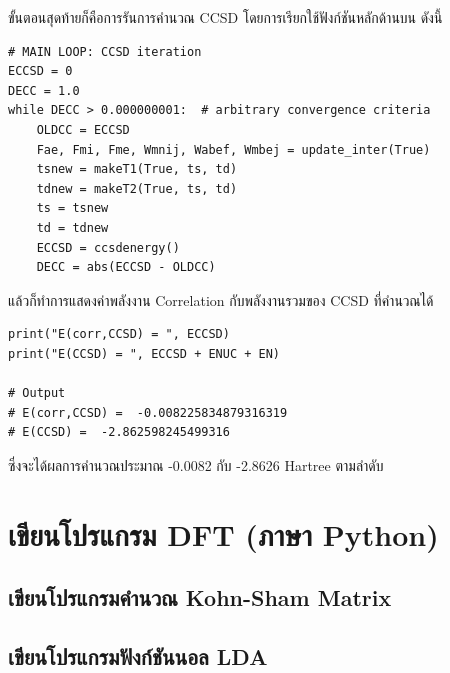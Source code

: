 \vspace{5pt}

\noindent ขั้นตอนสุดท้ายก็คือการรันการคำนวณ CCSD โดยการเรียกใช้ฟังก์ชันหลักด้านบน ดังนี้

\vspace{5pt}

\begin{lstlisting}[style=MyPython]
# MAIN LOOP: CCSD iteration
ECCSD = 0
DECC = 1.0
while DECC > 0.000000001:  # arbitrary convergence criteria
    OLDCC = ECCSD
    Fae, Fmi, Fme, Wmnij, Wabef, Wmbej = update_inter(True)
    tsnew = makeT1(True, ts, td)
    tdnew = makeT2(True, ts, td)
    ts = tsnew
    td = tdnew
    ECCSD = ccsdenergy()
    DECC = abs(ECCSD - OLDCC)
\end{lstlisting}

\vspace{5pt}

\noindent แล้วก็ทำการแสดงค่าพลังงาน Correlation กับพลังงานรวมของ CCSD ที่คำนวณได้

\vspace{5pt}

\begin{lstlisting}[style=MyPython]
print("E(corr,CCSD) = ", ECCSD)
print("E(CCSD) = ", ECCSD + ENUC + EN)

# Output
# E(corr,CCSD) =  -0.008225834879316319
# E(CCSD) =  -2.862598245499316
\end{lstlisting}

\vspace{5pt}

\noindent ซึ่งจะได้ผลการคำนวณประมาณ -0.0082 กับ -2.8626 Hartree ตามลำดับ

\vspace{5pt}

\section{เขียนโปรแกรม DFT (ภาษา Python)}

\subsection{เขียนโปรแกรมคำนวณ Kohn-Sham Matrix}

\subsection{เขียนโปรแกรมฟังก์ชันนอล LDA}

